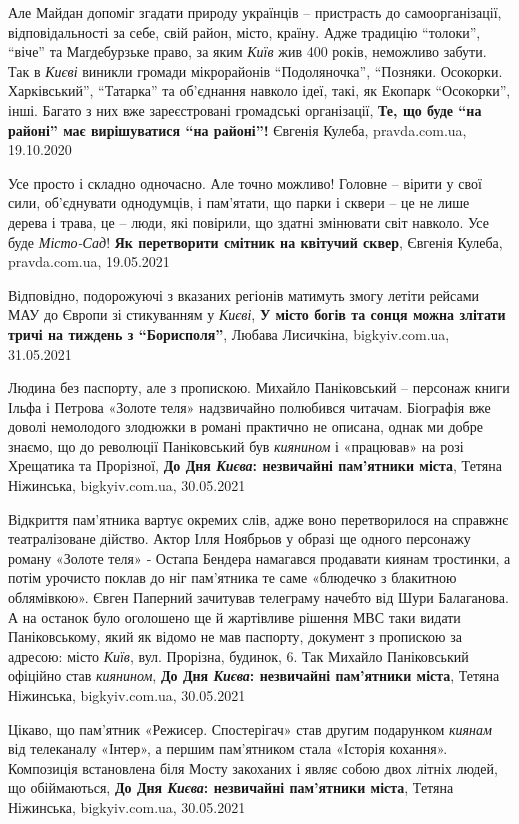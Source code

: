 Але Майдан допоміг згадати природу українців – пристрасть до самоорганізації,
відповідальності за себе, свій район, місто, країну. Адже традицію \enquote{толоки},
\enquote{віче} та Магдебурзьке право, за яким \emph{Київ} жив 400 років, неможливо забути.
Так в \emph{Києві} виникли громади мікрорайонів \enquote{Подоляночка}, 
\enquote{Позняки. Осокорки. Харківський}, \enquote{Татарка} та об'єднання навколо ідеї, такі, як 
Екопарк \enquote{Осокорки}, інші. Багато з них вже зареєстровані громадські організації,
\textbf{Те, що буде \enquote{на районі} має вирішуватися \enquote{на районі}!} Євгенія Кулеба, pravda.com.ua, 19.10.2020

Усе просто і складно одночасно. Але точно можливо! Головне – вірити у свої
сили, об'єднувати однодумців, і пам'ятати, що парки і сквери – це не лише
дерева і трава, це – люди, які повірили, що здатні змінювати світ навколо.  Усе
буде \emph{Місто-Сад}!
\textbf{Як перетворити смітник на квітучий сквер}, Євгенія Кулеба,
pravda.com.ua, 19.05.2021

Відповідно, подорожуючі з вказаних регіонів матимуть змогу летіти рейсами МАУ
до Європи зі стикуванням у \emph{Києві}, 
\textbf{У місто богів та сонця можна злітати тричі на тиждень з \enquote{Борисполя}}, Любава Лисичкіна,
bigkyiv.com.ua, 31.05.2021


Людина без паспорту, але з пропискою. Михайло Паніковський – персонаж книги
Ільфа і Петрова «Золоте теля» надзвичайно полюбився читачам. Біографія вже
доволі немолодого злодюжки в романі практично не описана, однак ми добре
знаємо, що до революції Паніковський був \emph{киянином} і «працював» на розі
Хрещатика та Прорізної, 
\textbf{До Дня \emph{Києва}: незвичайні пам'ятники міста}, Тетяна Ніжинська, 
bigkyiv.com.ua, 30.05.2021

Відкриття пам'ятника вартує окремих слів, адже воно перетворилося на справжнє
театралізоване дійство. Актор Ілля Ноябрьов у образі ще одного персонажу роману
«Золоте теля» ‑ Остапа Бендера намагався продавати киянам тростинки, а потім
урочисто поклав до ніг пам'ятника те саме «блюдечко з блакитною облямівкою».
Євген Паперний зачитував телеграму начебто від Шури Балаганова. А на останок
було оголошено ще й жартівливе рішення МВС таки видати Паніковському, який як
відомо не мав паспорту, документ з пропискою за адресою: місто \emph{Київ}, вул.
Прорізна, будинок, 6. Так Михайло Паніковський офіційно став \emph{киянином},
\textbf{До Дня \emph{Києва}: незвичайні пам'ятники міста}, Тетяна Ніжинська, 
bigkyiv.com.ua, 30.05.2021

Цікаво, що пам'ятник «Режисер. Спостерігач» став другим подарунком \emph{киянам} від
телеканалу «Інтер», а першим пам'ятником стала «Історія кохання». Композиція
встановлена біля Мосту закоханих і являє собою двох літніх людей, що
обіймаються,
\textbf{До Дня \emph{Києва}: незвичайні пам'ятники міста}, Тетяна Ніжинська, 
bigkyiv.com.ua, 30.05.2021

